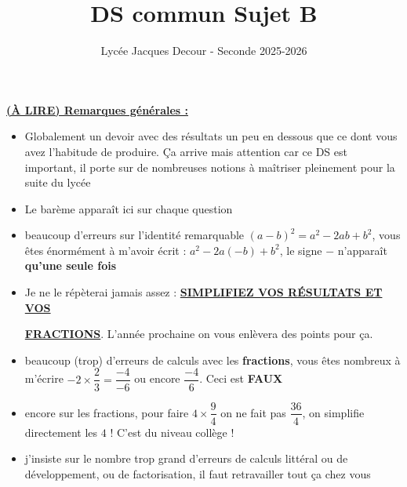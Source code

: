 \documentclass[12pt]{article}
\title{DS commun Sujet B}
\author{Lycée Jacques Decour - Seconde 2025-2026}
\date{}
\begin{document}
\maketitle

{\color{red}
\underline{\textbf{(À LIRE) Remarques générales :}}

\vspace{5pt}
\begin{itemize}
    \item Globalement un devoir avec des résultats un peu en dessous que ce dont vous avez l'habitude
    de produire. Ça arrive mais attention car ce DS est important, il porte sur de nombreuses 
    notions à maîtriser pleinement pour la suite du lycée

    \vspace{5pt}
    \item Le barème apparaît ici sur chaque question 
    
    \vspace{5pt}
    \item beaucoup d'erreurs sur l'identité remarquable $(a-b)^2 = a^2 - 2ab + b^2$, vous êtes énormément
    à m'avoir écrit : $a^2 -2a(-b) + b^2$, le signe $-$ n'apparaît \textbf{qu'une seule fois}

    \vspace{5pt}
    \item Je ne le répèterai jamais assez : \textbf{\underline{SIMPLIFIEZ VOS RÉSULTATS ET VOS}}

    \noindent\textbf{\underline{FRACTIONS}}. L'année prochaine on vous enlèvera des points pour ça.
    
    \vspace{5pt}
    \item beaucoup (trop) d'erreurs de calculs avec les \textbf{fractions}, vous êtes nombreux à 
    m'écrire $-2 \times \dfrac{2}{3} = \dfrac{-4}{-6}$ ou encore $\dfrac{-4}{6}$. Ceci est \textbf{FAUX}

    \vspace{5pt}
    \item encore sur les fractions, pour faire $4 \times \dfrac{9}{4}$ on ne fait pas $\dfrac{36}{4}$,
    on simplifie directement les $4$ ! C'est du niveau collège !

    \vspace{5pt}
    \item j'insiste sur le nombre trop grand d'erreurs de calculs littéral ou de développement, ou 
    de factorisation, il faut retravailler tout ça chez vous
\end{itemize}
}
\end{document}

